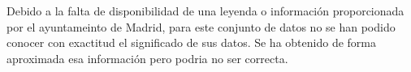 Debido a la falta de disponibilidad de una leyenda o información proporcionada por el ayuntameinto de Madrid, para este conjunto de datos no se han podido conocer con exactitud el significado de sus datos. Se ha obtenido de forma aproximada esa información pero podria no ser correcta.





